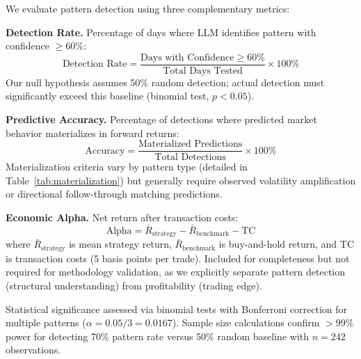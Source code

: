 We evaluate pattern detection using three complementary metrics:

\medskip
\textbf{Detection Rate.} Percentage of days where LLM identifies pattern with confidence $\geq 60\%$:
\begin{equation}
\text{Detection Rate} = \frac{\text{Days with Confidence} \geq 60\%}{\text{Total Days Tested}} \times 100\%
\end{equation}
Our null hypothesis assumes 50\% random detection; actual detection must significantly exceed this baseline (binomial test, $p < 0.05$).
\medskip

\textbf{Predictive Accuracy.} Percentage of detections where predicted market behavior materializes in forward returns:
\begin{equation}
\text{Accuracy} = \frac{\text{Materialized Predictions}}{\text{Total Detections}} \times 100\%
\end{equation}
Materialization criteria vary by pattern type (detailed in Table~\ref{tab:materialization}) but generally require observed volatility amplification or directional follow-through matching predictions.

\medskip
\textbf{Economic Alpha.} Net return after transaction costs:
\begin{equation}
\text{Alpha} = \bar{R}_{\text{strategy}} - \bar{R}_{\text{benchmark}} - \text{TC}
\end{equation}
where $\bar{R}_{\text{strategy}}$ is mean strategy return, $\bar{R}_{\text{benchmark}}$ is buy-and-hold return, and TC is transaction costs (5 basis points per trade). Included for completeness but not required for methodology validation, as we explicitly separate pattern detection (structural understanding) from profitability (trading edge).

Statistical significance assessed via binomial tests with Bonferroni correction for multiple patterns ($\alpha = 0.05/3 = 0.0167$). Sample size calculations confirm $>99\%$ power for detecting 70\% pattern rate versus 50\% random baseline with $n=242$ observations.